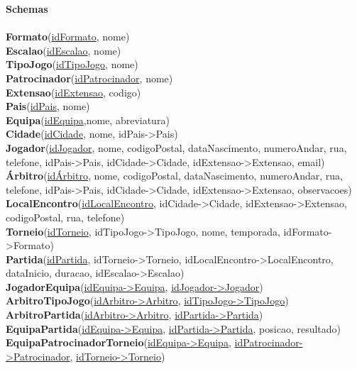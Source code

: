 \documentclass[a4paper]{article}
\begin{document}
\textbf{Schemas}
\\\\
\textbf{Formato}(\underline{idFormato}, nome) \\
\textbf{Escalao}(\underline{idEscalao}, nome) \\
\textbf{TipoJogo}(\underline{idTipoJogo}, nome) \\
\textbf{Patrocinador}(\underline{idPatrocinador}, nome) \\
\textbf{Extensao}(\underline{idExtensao}, codigo) \\
\textbf{Pais}(\underline{idPais}, nome) \\
\textbf{Equipa}(\underline{idEquipa},nome, abreviatura) \\
\textbf{Cidade}(\underline{idCidade}, nome, idPais->Pais) \\
\textbf{Jogador}(\underline{idJogador}, nome, codigoPostal, dataNascimento, numeroAndar, rua, telefone, idPais->Pais, idCidade->Cidade, idExtensao->Extensao, email) \\
\textbf{Árbitro}(\underline{idÁrbitro}, nome, codigoPostal, dataNascimento, numeroAndar, rua, telefone, idPais->Pais, idCidade->Cidade, idExtensao->Extensao, observacoes) \\
\textbf{LocalEncontro}(\underline{idLocalEncontro}, idCidade->Cidade, idExtensao->Extensao, codigoPostal, rua, telefone) \\
\textbf{Torneio}(\underline{idTorneio}, idTipoJogo->TipoJogo, nome, temporada, idFormato->Formato) \\
\textbf{Partida}(\underline{idPartida}, idTorneio->Torneio, idLocalEncontro->LocalEncontro, dataInicio, duracao, idEscalao->Escalao) \\
\textbf{JogadorEquipa}(\underline{idEquipa->Equipa}, \underline{idJogador->Jogador}) \\
\textbf{ArbitroTipoJogo}(\underline{idArbitro->Arbitro}, \underline{idTipoJogo->TipoJogo}) \\
\textbf{ArbitroPartida}(\underline{idArbitro->Arbitro}, \underline{idPartida->Partida}) \\
\textbf{EquipaPartida}(\underline{idEquipa->Equipa}, \underline{idPartida->Partida}, posicao, resultado) \\
\textbf{EquipaPatrocinadorTorneio}(\underline{idEquipa->Equipa}, \underline{idPatrocinador->Patrocinador}, \underline{idTorneio->Torneio})
\\\newline
\end{document}
